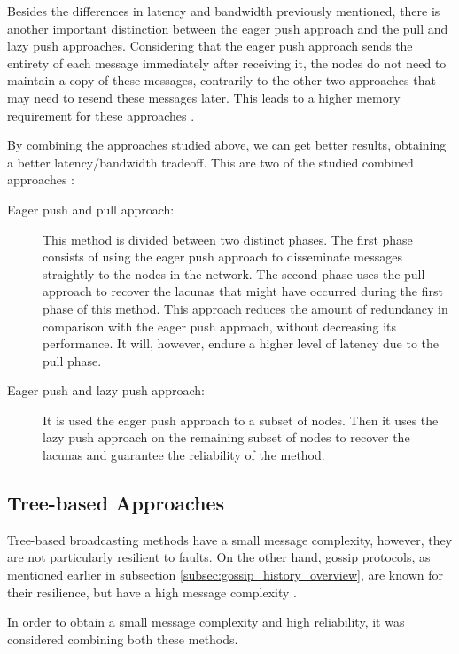 Besides the differences in latency and bandwidth previously mentioned, there is another important
distinction between the eager push approach and the pull and lazy push approaches.
Considering that the eager push approach sends the entirety of each message immediately after
receiving it, the nodes do not need to maintain a copy of these messages, contrarily to the
other two approaches that may need to resend these messages later. This leads to a higher
memory requirement for these approaches \cite{Leitao2012}.

By combining the approaches studied above, we can get better results, obtaining a better
latency/bandwidth tradeoff. This are two of the studied combined approaches \cite{Carvalho2007}:
\begin{description}
    \item[Eager push and pull approach:] This method is divided between two distinct phases.
        The first phase consists of using the eager push approach to disseminate messages
        straightly to the nodes in the network. The second phase uses the pull approach to
        recover the lacunas that might have occurred during the first phase of this method.
        This approach reduces the amount of redundancy in comparison with the eager push
        approach, without decreasing its performance. It will, however, endure a higher level
        of latency due to the pull phase.
    \item[Eager push and lazy push approach:] It is used the eager push approach to a subset of
        nodes. Then it uses the lazy push approach on the remaining subset of nodes to recover
        the lacunas and guarantee the reliability of the method.
\end{description}


\subsection{Tree-based Approaches}
\label{subsec:gossip_tree_based_approaches}
Tree-based broadcasting methods have a small message complexity, however, they are not
particularly resilient to faults. On the other hand, gossip protocols, as mentioned earlier
in subsection \ref{subsec:gossip_history_overview}, are known for their resilience, but have a
high message complexity \cite{Leitao2007Tree}.

In order to obtain a small message complexity and high reliability, it was considered
combining both these methods.

